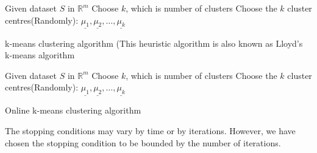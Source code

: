 \documentclass{article}
\begin{document}
\begin{algorithm}[H]
\SetAlgoLined
 Given dataset $S$ in $\mathbb{R}^m$\;
 Choose $k$, which is number of clusters\;
 Choose the $k$ cluster centres(Randomly): $\underline{\mu_1}, \underline{\mu_2}, \dots, \underline{\mu_k}$\;
 \caption{k-means clustering algorithm (This heuristic algorithm is also known as Lloyd's k-means algorithm}
\end{algorithm}

\begin{algorithm}[H]
\SetAlgoLined
 Given dataset $S$ in $\mathbb{R}^m$\;
 Choose $k$, which is number of clusters\;
 Choose the $k$ cluster centres(Randomly): $\underline{\mu_1}, \underline{\mu_2}, \dots, \underline{\mu_k}$\;
 \caption{Online k-means clustering algorithm}
\end{algorithm}

The stopping conditions may vary by time or by iterations. However, we have chosen the stopping condition to be bounded by the number of iterations.
\end{document}
